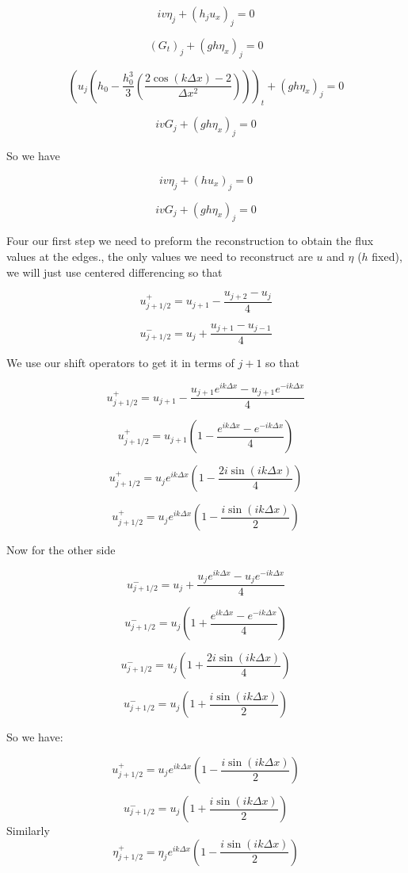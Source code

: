 \documentclass[12pt]{article}
\begin{document}
\[iv\eta_j +  \left(h_j u_x \right)_j = 0\]

\[ \left(G_t\right)_j  + \left(gh \eta_x \right)_j  = 0\]


\[ \left(u_j \left( h_0 -  \frac{h_0^3}{3} \left(\dfrac{2\cos\left(k{\Delta x}\right) - 2}{\Delta x^2}\right) \right)\right)_t  + \left(gh \eta_x \right)_j  = 0\]

\[iv G_j + \left(gh \eta_x \right)_j  = 0\]

So we have 

\[iv\eta_j +  \left(h u_x \right)_j = 0\]

\[iv G_j + \left(gh \eta_x \right)_j  = 0\]

Four our first step we need to preform the reconstruction to obtain the flux values at the edges., the only values we need to reconstruct are $u$ and $\eta$ ($h$ fixed), we will just use centered differencing so that

\[u^+_{j + 1/2} = u_{j+1} - \frac{u_{j+2} - u_{j}}{4} \]

\[u^-_{j + 1/2} = u_{j} + \frac{u_{j+1} - u_{j-1}}{4} \]


We use our shift operators to get it in terms of $j+1$ so that

\[u^+_{j + 1/2} = u_{j+1} - \frac{u_{j+1}e^{ik\Delta x}  - u_{j+1}e^{-ik\Delta x}  }{4} \]

\[u^+_{j + 1/2} = u_{j+1} \left(1 -\frac{e^{ik\Delta x}  - e^{-ik\Delta x}  }{4} \right) \]

\[u^+_{j + 1/2} = u_{j} e^{ik\Delta x}   \left(1 -\frac{2i \sin\left(ik\Delta x\right)  }{4} \right) \]

\[u^+_{j + 1/2} = u_{j} e^{ik\Delta x}   \left(1 -\frac{i \sin\left(ik\Delta x\right)  }{2} \right) \]

Now for the other side

\[u^-_{j + 1/2} = u_{j} + \frac{u_{j}e^{ik\Delta x} - u_{j}e^{-ik\Delta x}}{4} \]

\[u^-_{j + 1/2} = u_{j}\left( 1 + \frac{e^{ik\Delta x} - e^{-ik\Delta x}}{4}\right) \]

\[u^-_{j + 1/2} = u_{j}\left( 1 + \frac{2i\sin\left({ik\Delta x}\right) }{4}\right) \]

\[u^-_{j + 1/2} = u_{j}\left( 1 + \frac{i\sin\left({ik\Delta x}\right) }{2}\right) \]

So we have:

\[u^+_{j + 1/2} = u_{j} e^{ik\Delta x}   \left(1 -\frac{i \sin\left(ik\Delta x\right)  }{2} \right) \]

\[u^-_{j + 1/2} = u_{j}\left( 1 + \frac{i\sin\left({ik\Delta x}\right) }{2}\right) \]
Similarly
\[\eta^+_{j + 1/2} = \eta_{j} e^{ik\Delta x}   \left(1 -\frac{i \sin\left(ik\Delta x\right)  }{2} \right) \]
\end{document}
